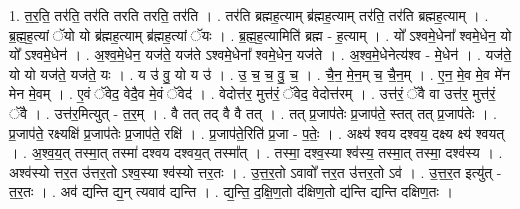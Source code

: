 \documentclass[17pt]{extarticle}
\begin{document}
1. त॒र॒ति॒ तर॑ति॒ तर॑ति तरति तरति॒ तर॑ति । . तर॑ति ब्रह्मह॒त्याम् ब्र॑ह्मह॒त्याम् तर॑ति॒ तर॑ति ब्रह्मह॒त्याम् । . ब्र॒ह्म॒ह॒त्यां ॅयो यो ब्र॑ह्मह॒त्याम् ब्र॑ह्मह॒त्यां ॅयः । . ब्र॒ह्म॒ह॒त्यामिति॑ ब्रह्म - ह॒त्याम् । . यो᳚ ऽश्वमे॒धेना᳚ श्वमे॒धेन॒ यो यो᳚ ऽश्वमे॒धेन॑ । . अ॒श्व॒मे॒धेन॒ यज॑ते॒ यज॑ते ऽश्वमे॒धेना᳚ श्वमे॒धेन॒ यज॑ते । . अ॒श्व॒मे॒धेनेत्य॑श्व - मे॒धेन॑ । . यज॑ते॒ यो यो यज॑ते॒ यज॑ते॒ यः । . य उ॑ वु॒ यो य उ॑ । . उ॒ च॒ च॒ वु॒ च॒ । . चै॒न॒ मे॒न॒म् च॒ चै॒न॒म् । . ए॒न॒ मे॒व मे॒व मे॑न मेन मे॒वम् । . ए॒वं ॅवेद॒ वेदै॒व मे॒वं ॅवेद॑ । . वेदोत्त॑र॒ मुत्त॑रं॒ ॅवेद॒ वेदोत्त॑रम् । . उत्त॑रं॒ ॅवै वा उत्त॑र॒ मुत्त॑रं॒ ॅवै । . उत्त॑र॒मित्युत् - त॒र॒म् । . वै तत् तद् वै वै तत् । . तत् प्र॒जाप॑तेः प्र॒जाप॑ते॒ स्तत् तत् प्र॒जाप॑तेः । . प्र॒जाप॑ते॒ रक्ष्यक्षि॑ प्र॒जाप॑तेः प्र॒जाप॑ते॒ रक्षि॑ । . प्र॒जाप॑ते॒रिति॑ प्र॒जा - प॒तेः॒ । . अक्ष्य॑ श्वय दश्वय॒ दक्ष्य क्ष्य॑ श्वयत् । . अ॒श्व॒य॒त् तस्मा॒त् तस्मा॑ दश्वय दश्वय॒त् तस्मा᳚त् । . तस्मा॒ दश्व॒स्या श्व॑स्य॒ तस्मा॒त् तस्मा॒ दश्व॑स्य । . अश्व॑स्यो त्तर॒त उ॑त्तर॒तो ऽश्व॒स्या श्व॑स्यो त्तर॒तः । . उ॒त्त॒र॒तो ऽवावो᳚ त्तर॒त उ॑त्तर॒तो ऽव॑ । . उ॒त्त॒र॒त इत्यु॑त् - त॒र॒तः । . अव॑ द्यन्ति द्य॒न् त्यवाव॑ द्यन्ति । . द्य॒न्ति॒ द॒क्षि॒ण॒तो द॑क्षिण॒तो द्य॑न्ति द्यन्ति दक्षिण॒तः । \newline
\end{document}
